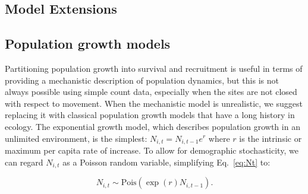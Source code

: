 \documentclass[12pt,english]{article}
\begin{document}
\begin{spacing}{1.9}
\begin{flushleft}
\section*{Model Extensions}
\label{sec:ext}
\subsection*{Population growth models}
Partitioning population growth into survival and recruitment
is useful  
in terms of providing a mechanistic description of population
dynamics, but this is not always possible using simple count data,
especially when the sites are not closed with respect to movement.
When the mechanistic model is unrealistic, we suggest replacing it
with classical population growth models that have a long history in ecology.
The exponential growth model, which describes population growth in an 
unlimited environment, is the simplest: 
$N_{i,t} = N_{i,t-1}e^r$ where $r$ is the intrinsic or maximum per capita
rate of increase. 
To allow for demographic stochasticity, we can regard $N_{i,t}$ as a Poisson 
random variable, simplifying Eq.~\ref{eq:Nt} to:
\begin{linenomath*}
\begin{equation}
  N_{i,t} \sim \mathrm{Pois}(\exp(r)N_{i,t-1}).
\label{eq:exp}
\end{equation}
\end{linenomath*}


\end{flushleft}
\end{spacing}
\end{document}
